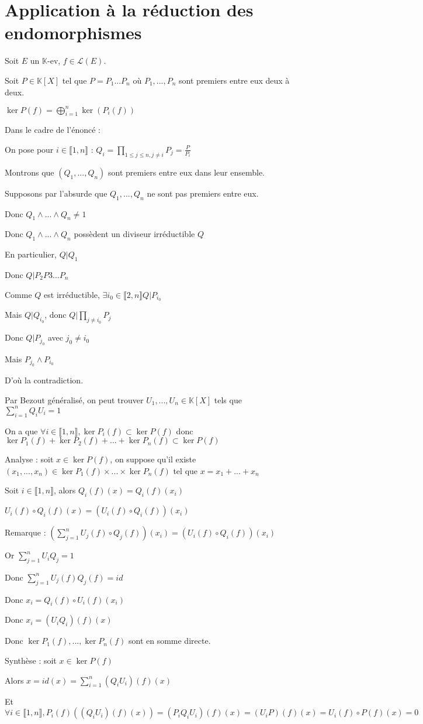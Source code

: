 \documentclass[a4paper,12pt]{book}
\newcommand{\Thr}[2]{\begin{tcolorbox}[sharp corners, colback=white,colframe=red!90!black!75, title=Théorème : #1]#2\end{tcolorbox}}
\newcommand{\Pre}[1]{\begin{tcolorbox}[sharp corners, colback=white,colframe=green!60!green!30!black!75, title=Preuve]#1\end{tcolorbox}}
\def\K{\mathbb{K}}
\begin{document}
\section{Application à la réduction des endomorphismes}
\Thr{Lemme des noyaux}{Soit $E$ un $\K$-ev, $f\in \mathcal{L}(E)$.
\par Soit $P\in \K[X]$ tel que $P=P_1...P_n$ où $P_1,...,P_n$ sont premiers entre eux deux à deux.
\par $\ker P(f) = \bigoplus\limits_{i=1}^n\ker(P_i(f))$}
\Pre{Dans le cadre de l'énoncé : \par On pose pour $i\in\llbracket 1,n\rrbracket$ : $Q_i = \prod\limits_{1\leq j\leq n, j\neq i} P_j = \frac{P}{P_i}$ \par Montrons que $(Q_1,..., Q_n)$ sont premiers entre eux dans leur ensemble. \par Supposons par l'absurde que $Q_1,...,Q_n$ ne sont pas premiers entre eux. \par Donc $Q_1\wedge...\wedge Q_n \neq 1$ \par Donc $Q_1\wedge...\wedge Q_n$ possèdent un diviseur irréductible $Q$ \par En particulier, $Q\vert Q_1$ \par Donc $Q\vert P_2P3...P_n$
\par Comme $Q$ est irréductible, $\exists i_0\in \llbracket 2,n\rrbracket Q\vert P_{i_0}$ \par Mais $Q\vert Q_{i_0}$, donc $Q\vert \prod\limits_{j\neq i_0}P_j$ \par Donc $Q\vert P_{j_0}$ avec $j_0\neq i_0$ \par Mais $P_{j_0}\wedge P_{i_0}$ \par D'où la contradiction.
\par Par Bezout généralisé, on peut trouver $U_1,...,U_n\in\K[X]$ tels que $\sum\limits_{i=1}^nQ_iU_i=1$ \par On a que $\forall i\in\llbracket 1,n\rrbracket, \ker P_i(f) \subset\ker P(f)$ donc $\ker P_1(f)+\ker P_2(f)+...+\ker P_n(f)\subset \ker P(f)$ \par Analyse : soit $x\in \ker P(f)$, on suppose qu'il existe $(x_1,...,x_n)\in \ker P_1(f)\times...\times\ker P_n(f)$ tel que $x=x_1+...+x_n$ \par Soit $i\in \llbracket 1,n\rrbracket$, alors $Q_i(f)(x)=Q_i(f)(x_i)$ \par $U_i(f)\circ Q_i(f)(x) = (U_i(f)\circ Q_i(f))(x_i)$
\par Remarque : $\left(\sum\limits_{j=1}^nU_j(f)\circ Q_j(f)\right)(x_i) = (U_i(f)\circ Q_i(f))(x_i)$ \par Or $\sum\limits_{j=1}^nU_iQ_j=1$ \par Donc $\sum\limits_{j=1}^nU_j(f)Q_j(f)=id$ \par Donc $x_i = Q_i(f)\circ U_i(f)(x_i)$ \par Donc $x_i = (U_iQ_i)(f)(x)$ \par Donc $\ker P_1(f),..., \ker P_n(f)$ sont en somme directe.
\par Synthèse : soit $x\in \ker P(f)$ \par Alors $x = id(x) = \sum\limits_{i=1}^n(Q_iU_i)(f)(x)$ \par Et $\forall i\in\llbracket1,n\rrbracket, P_i(f)((Q_iU_i)(f)(x)) = (P_iQ_iU_i)(f)(x)=(U_iP)(f)(x)= U_i(f)\circ P(f)(x)=0$}
\end{document}
